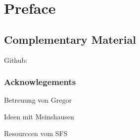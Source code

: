 \chapter*{Preface}
\section*{Complementary Material}


Github: 


\subsection*{Acknowlegements}
Betreuung von Gregor

Ideen mit Meinshausen

Resourccen vom SFS


